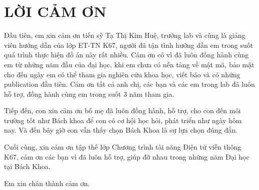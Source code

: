 \newpage
\section*{LỜI CẢM ƠN}
    \thispagestyle{empty}
Đầu tiên, em xin cảm ơn tiến sỹ Tạ Thị Kim Huệ, trưởng lab và cũng là giảng viên hướng dẫn của lớp ET-TN K67, người đã tận tình hướng dẫn em trong suốt quá trình thực hiện đồ án này rất nhiều. Cảm ơn cô vì đã luôn đồng hành cùng em từ những năm đầu của đại học, khi em chưa có nền tảng về mật mã, bảo mật cho đến ngày em có thể tham gia nghiên cứu khoa học, viết báo và có những publication đầu tiên. Cảm ơn tất cả anh chị, các bạn và các em trong lab đã luôn hỗ trợ, đồng hành cùng em trong suốt 3 năm tham gia.

Tiếp đến, con xin cảm ơn bố mẹ đã luôn đồng hành, hỗ trợ, cho con đến môi trường tốt như Bách khoa để con có cơ hội học hỏi, phát triển như ngày hôm nay. Và đến bây giờ con vẫn thấy chọn Bách Khoa là sự lựa chọn đúng đắn.

Cuối cùng, xin cảm ơn tập thế lớp Chương trình tài năng Điện tử viễn thông K67, cảm ơn các bạn vì đã luôn hỗ trợ, giúp đỡ nhau trong những năm Đại học tại Bách Khoa.

Em xin chân thành cảm ơn.

\newpage
    \thispagestyle{empty}
        \clearpage
            \thispagestyle{empty}
                \cleardoublepage